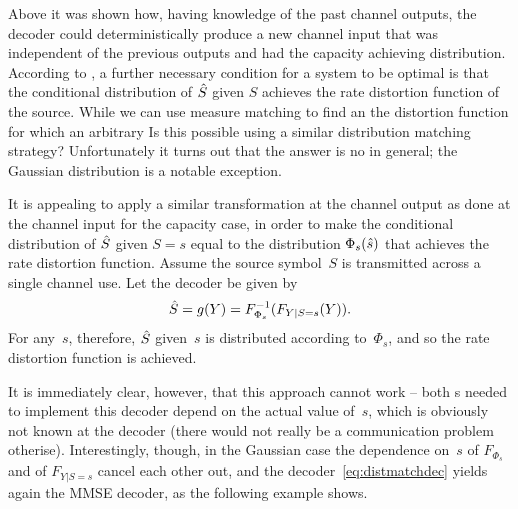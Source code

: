 Above it was shown how, having knowledge of the past channel outputs,
the decoder could deterministically produce a new channel input that was
independent of the previous outputs and had the capacity achieving distribution.
According to , a further necessary
condition for a system to be optimal is that the conditional distribution of
${\hat{S}}$ given $S$ achieves the rate distortion function of the source. While we
can use measure matching to find an the distortion function for which an
arbitrary Is this possible using a similar distribution matching strategy?
Unfortunately it turns out that the answer is no in general; the Gaussian
distribution is a notable exception.

It is appealing to apply a similar transformation at the channel output as done
at the channel input for the capacity case, in order to make the conditional
distribution of ${\hat{S}}$ given $S=s$ equal to the distribution $\Phi_s({\hat{s}})$ that
achieves the rate distortion function. Assume the source symbol~$S$ is
transmitted across a single channel use. Let the decoder be given by
\begin{equation}
  \label{eq:distmatchdec}
  {\hat{S}} = g(Y) = F_{\Phi_s}^{-1}(F_{Y|S=s}(Y)).
\end{equation}
For any~$s$, therefore, ${\hat{S}}$ given~$s$ is distributed according to~$\Phi_s$,
and so the rate distortion function is achieved.

It is immediately clear, however, that this approach cannot work -- both \cdf s
needed to implement this decoder depend on the actual value of~$s$, which is
obviously not known at the decoder (there would not really be a communication
problem otherise). Interestingly, though, in the Gaussian case the dependence
on~$s$ of $F_{\Phi_s}$ and of $F_{Y|S=s}$ cancel each other out, and the
decoder~\eqref{eq:distmatchdec} yields again the MMSE decoder, as the following
example shows.

